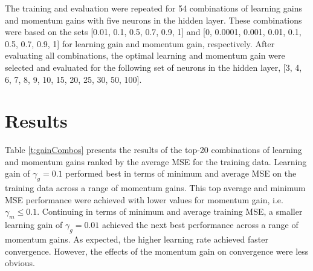 \documentclass[11pt,pdftex,portrait,letterpaper]{article}
\begin{document}
The training and evaluation were repeated for 54 combinations of learning gains and momentum gains with five neurons in the hidden layer. These combinations were based on the sets [0.01, 0.1, 0.5, 0.7, 0.9,  1] and [0, 0.0001, 0.001, 0.01, 0.1, 0.5, 0.7, 0.9, 1] for learning gain and momentum gain, respectively. After evaluating all combinations, the optimal learning and momentum gain were selected and evaluated for the following set of neurons in the hidden layer, [3, 4, 6, 7, 8, 9, 10, 15, 20, 25, 30, 50, 100].

\section{Results}

Table \ref{t:gainCombos} presents the results of the top-20 combinations of learning and momentum gains ranked by the average MSE for the training data. Learning gain of $\gamma_g=0.1$ performed best in terms of minimum and average MSE on the training data across a range of momentum gains. This top average and minimum MSE performance were achieved with lower values for momentum gain, i.e. $\gamma_m \leq 0.1$. Continuing in terms of minimum and average training MSE, a smaller learning gain of $\gamma_g=0.01$ achieved the next best performance across a range of momentum gains. As expected, the higher learning rate achieved faster convergence. However, the effects of the momentum gain on convergence were less obvious.
\end{document}
